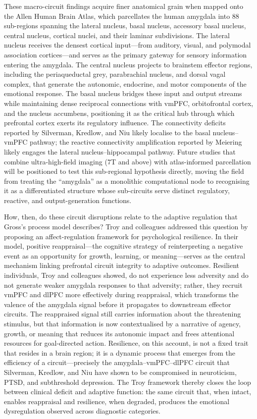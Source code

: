 These macro-circuit findings acquire finer anatomical grain when mapped
onto the Allen Human Brain Atlas, which parcellates the human amygdala into
88 sub-regions spanning the lateral nucleus, basal nucleus, accessory basal
nucleus, central nucleus, cortical nuclei, and their laminar
subdivisions.\cite{hawrylycz2012}  The lateral nucleus receives the densest cortical
input---from auditory, visual, and polymodal association cortices---and
serves as the primary gateway for sensory information entering the
amygdala.  The central nucleus projects to brainstem effector regions,
including the periaqueductal grey, parabrachial nucleus, and dorsal vagal
complex, that generate the autonomic, endocrine, and motor components of
the emotional response.  The basal nucleus bridges these input and output
streams while maintaining dense reciprocal connections with vmPFC,
orbitofrontal cortex, and the nucleus accumbens, positioning it as the
critical hub through which prefrontal cortex exerts its regulatory
influence.  The connectivity deficits reported by Silverman, Kredlow, and
Niu likely localise to the basal nucleus--vmPFC pathway; the reactive
connectivity amplification reported by Meiering likely engages the lateral
nucleus--hippocampal pathway.  Future studies that combine ultra-high-field
imaging (7T and above) with atlas-informed parcellation will be positioned
to test this sub-regional hypothesis directly, moving the field from
treating the ``amygdala'' as a monolithic computational node to recognising
it as a differentiated structure whose sub-circuits serve distinct
regulatory, reactive, and output-generation functions.

How, then, do these circuit disruptions relate to the adaptive regulation
that Gross's process model describes?  Troy and colleagues addressed this
question by proposing an affect-regulation framework for psychological
resilience.\cite{troy2022}  In their model, positive reappraisal---the cognitive
strategy of reinterpreting a negative event as an opportunity for growth,
learning, or meaning---serves as the central mechanism linking prefrontal
circuit integrity to adaptive outcomes.  Resilient individuals, Troy and
colleagues showed, do not experience less adversity and do not generate
weaker amygdala responses to that adversity; rather, they recruit vmPFC and
dlPFC more effectively during reappraisal, which transforms the valence of
the amygdala signal before it propagates to downstream effector circuits.
The reappraised signal still carries information about the threatening
stimulus, but that information is now contextualised by a narrative of
agency, growth, or meaning that reduces its autonomic impact and frees
attentional resources for goal-directed action.  Resilience, on this
account, is not a fixed trait that resides in a brain region; it is a
dynamic process that emerges from the efficiency of a circuit---precisely
the amygdala--vmPFC--dlPFC circuit that Silverman, Kredlow, and Niu have
shown to be compromised in neuroticism, PTSD, and subthreshold depression.
The Troy framework thereby closes the loop between clinical deficit and
adaptive function: the same circuit that, when intact, enables reappraisal
and resilience, when degraded, produces the emotional dysregulation observed
across diagnostic categories.

